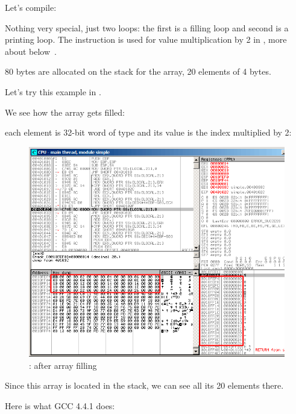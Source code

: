 

Let's compile:




Nothing very special, just two loops: the first is a filling loop and second is a printing loop.
The  instruction is used for value multiplication by 2 in \ECX, more about below~.

80 bytes are allocated on the stack for the array, 20 elements of 4 bytes.

\clearpage
Let's try this example in \olly.
\myindex{\olly}

We see how the array gets filled: 

each element is 32-bit word of \Tint type and its value is the index multiplied by 2:

\begin{figure}[H]
\centering
\includegraphics[scale=\FigScale]{patterns/13_arrays/1_simple/olly.png}
\caption{\olly: after array filling}
\label{fig:array_simple_olly}
\end{figure}

Since this array is located in the stack, we can see all its 20 elements there.


Here is what GCC 4.4.1 does:

